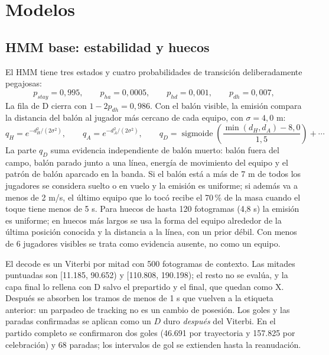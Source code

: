 \documentclass[10pt,a4paper]{article}
\begin{document}
\section{Modelos}

\subsection{HMM base: estabilidad y huecos}

El HMM tiene tres estados y cuatro probabilidades de transición deliberadamente pegajosas:
\begin{equation}
p_{stay}=0{,}995,\qquad p_{ha}=0{,}0005,\qquad p_{hd}=0{,}001,\qquad p_{dh}=0{,}007,
\label{eq:trans}
\end{equation}
La fila de D cierra con $1-2p_{dh}=0{,}986$. Con el balón visible, la emisión compara la distancia del balón al jugador más cercano de cada
equipo, con $\sigma=4{,}0$ m:
\begin{equation}
q_H=e^{-d_H^2/(2\sigma^2)},\qquad
q_A=e^{-d_A^2/(2\sigma^2)},\qquad
q_D=\operatorname{sigmoide}\!\left(\frac{\min(d_H,d_A)-8{,}0}{1{,}5}\right)+\cdots
\label{eq:emis}
\end{equation}
La parte $q_D$ suma evidencia independiente de balón muerto: balón fuera del campo, balón parado
junto a una línea, energía de movimiento del equipo y el patrón de balón aparcado en la banda. Si
el balón está a más de 7 m de todos los jugadores se considera suelto o en vuelo y la emisión es
uniforme; si además va a menos de 2 m/s, el último equipo que lo tocó recibe el 70\,\% de la masa
cuando el toque tiene menos de 5 s. Para huecos de hasta 120 fotogramas (4,8 s) la emisión es
uniforme; en huecos más largos se usa la forma del equipo alrededor de la última posición conocida
y la distancia a la línea, con un prior débil. Con menos de 6 jugadores visibles se trata como
evidencia ausente, no como un equipo.

El decode es un Viterbi por mitad con 500 fotogramas de contexto. Las mitades puntuadas son
[11.185, 90.652) y [110.808, 190.198); el resto no se evalúa, y la capa final lo rellena con D
salvo el prepartido y el final, que quedan como X. Después se absorben los tramos de menos de 1 s que vuelven a la etiqueta
anterior: un parpadeo de tracking no es un cambio de posesión. Los goles y las paradas confirmadas
se aplican como un $D$ duro \emph{después} del Viterbi. En el partido completo se confirmaron dos
goles (46.691 por trayectoria y 157.825 por celebración) y 68 paradas; los intervalos de gol se
extienden hasta la reanudación.
\end{document}
